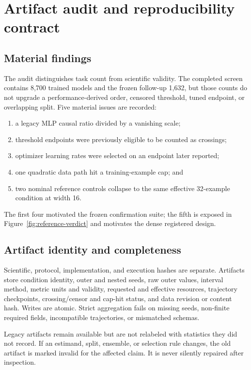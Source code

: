 \section{Artifact audit and reproducibility contract}
\label{app:audit}

\subsection{Material findings}

The audit distinguishes task count from scientific validity. The completed
screen contains 8,700 trained models and the frozen follow-up 1,632, but those
counts do not upgrade a performance-derived order, censored threshold, tuned
endpoint, or overlapping split. Five material issues are recorded:
\begin{enumerate}
  \item a legacy MLP causal ratio divided by a vanishing scale;
  \item threshold endpoints were previously eligible to be counted as crossings;
  \item optimizer learning rates were selected on an endpoint later reported;
  \item one quadratic data path hit a training-example cap; and
  \item two nominal reference controls collapse to the same effective 32-example
  condition at width 16.
\end{enumerate}
The first four motivated the frozen confirmation suite; the fifth is exposed in
Figure~\ref{fig:reference-verdict} and motivates the dense registered design.

\subsection{Artifact identity and completeness}

Scientific, protocol, implementation, and execution hashes are separate.
Artifacts store condition identity, outer and nested seeds, raw outer values,
interval method, metric units and validity, requested and effective resources,
trajectory checkpoints, crossing/censor and cap-hit status, and data revision
or content hash. Writes are atomic. Strict aggregation fails on missing seeds,
non-finite required fields, incompatible trajectories, or mismatched schemas.

Legacy artifacts remain available but are not relabeled with statistics they did
not record. If an estimand, split, ensemble, or selection rule changes, the old
artifact is marked invalid for the affected claim. It is never silently repaired
after inspection.

